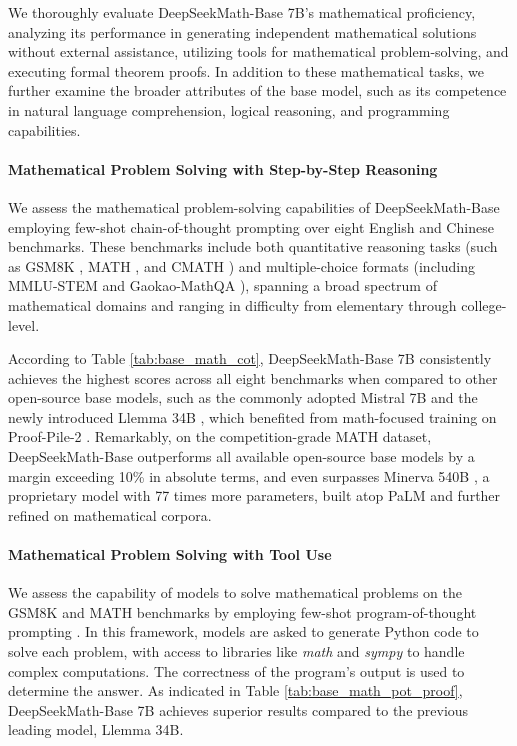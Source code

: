 \begin{itemize}[topsep=0pt]
We thoroughly evaluate DeepSeekMath-Base 7B’s mathematical proficiency, analyzing its performance in generating independent mathematical solutions without external assistance, utilizing tools for mathematical problem-solving, and executing formal theorem proofs. In addition to these mathematical tasks, we further examine the broader attributes of the base model, such as its competence in natural language comprehension, logical reasoning, and programming capabilities.

\paragraph{Mathematical Problem Solving with Step-by-Step Reasoning}

We assess the mathematical problem-solving capabilities of DeepSeekMath-Base employing few-shot chain-of-thought prompting \citep{cot} over eight English and Chinese benchmarks. These benchmarks include both quantitative reasoning tasks (such as GSM8K \citep{gsm8k}, MATH \citep{MATH}, and CMATH \citep{wei2023cmath}) and multiple-choice formats (including MMLU-STEM \citep{mmlu} and Gaokao-MathQA \citep{agieval}), spanning a broad spectrum of mathematical domains and ranging in difficulty from elementary through college-level.

According to Table \ref{tab:base_math_cot}, DeepSeekMath-Base 7B consistently achieves the highest scores across all eight benchmarks when compared to other open-source base models, such as the commonly adopted Mistral 7B \citep{mistral} and the newly introduced Llemma 34B \citep{llemma}, which benefited from math-focused training on Proof-Pile-2 \citep{llemma}. Remarkably, on the competition-grade MATH dataset, DeepSeekMath-Base outperforms all available open-source base models by a margin exceeding 10\% in absolute terms, and even surpasses Minerva 540B \citep{minerva}, a proprietary model with 77 times more parameters, built atop PaLM \citep{palm} and further refined on mathematical corpora.

\paragraph{Mathematical Problem Solving with Tool Use} We assess the capability of models to solve mathematical problems on the GSM8K and MATH benchmarks by employing few-shot program-of-thought prompting \citep{pot,pal}. In this framework, models are asked to generate Python code to solve each problem, with access to libraries like \textit{math} and \textit{sympy} to handle complex computations. The correctness of the program's output is used to determine the answer. As indicated in Table \ref{tab:base_math_pot_proof}, DeepSeekMath-Base 7B achieves superior results compared to the previous leading model, Llemma 34B.


\end{itemize}
